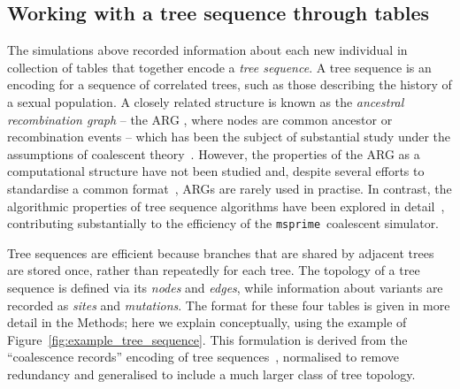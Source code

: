 \documentclass{article}
\newcommand{\simupop}{\texttt{simuPOP}}
\newcommand{\msprime}{\texttt{msprime}}
\begin{document}
%



\subsection*{Working with a tree sequence through tables}

The simulations above recorded information about each new individual
in collection of tables that together encode a \emph{tree sequence}.
A {tree sequence} is an encoding for a sequence of correlated trees,
such as those describing the history of a sexual population.
A closely related structure is known as the \emph{ancestral recombination graph} --
the {ARG} \citep{griffiths1991two,griffiths1997ancestral},
where nodes are common ancestor or recombination events --
which has been the subject of substantial study
under the assumptions of coalescent
theory~\citep{wiuf1997number,wiuf1999ancestry,marjoram2006coalescent,wilton2015smc}.
However, the properties of the ARG as a computational structure have not
been studied and, despite several efforts to standardise a common
format~\citep{morin2006netgen,mcgill2013graphml}, %
ARGs are rarely used
in practise. In contrast, the algorithmic properties of tree sequence
algorithms have been explored in detail~\citep{kelleher2016efficient},
contributing substantially to the efficiency of the \msprime\ coalescent simulator.

Tree sequences are efficient because branches that are shared by adjacent trees are stored once,
rather than repeatedly for each tree.
The topology of a tree sequence is defined via its \emph{nodes} and \emph{edges},
while information about variants are recorded as \emph{sites} and \emph{mutations}.
The format for these four tables is given in more detail in the Methods;
here we explain conceptually,
using the example of Figure~\ref{fig:example_tree_sequence}. This formulation
is derived from the ``coalescence records'' encoding of tree
sequences~\citep{kelleher2016efficient}, normalised to remove redundancy
and generalised to include a much larger class of tree topology.
\end{document}
